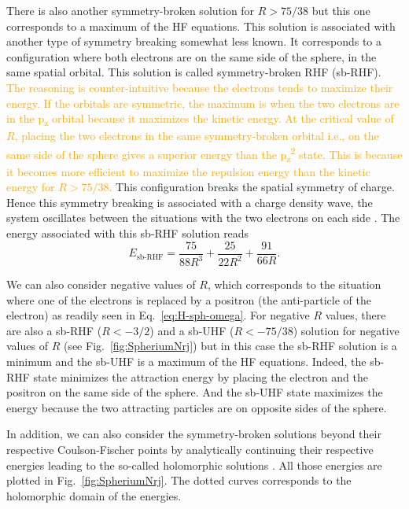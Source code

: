 \documentclass[11pt,a4paper]{article}
\newcommand{\antoine}[1]{\textcolor{orange}{#1}}
\begin{document}
There is also another symmetry-broken solution for $R>75/38$ but this one corresponds to a maximum of the HF equations. This solution is associated with another type of symmetry breaking somewhat less known. It corresponds to a configuration where both electrons are on the same side of the sphere, in the same spatial orbital. This solution is called symmetry-broken RHF (sb-RHF). \antoine{The reasoning is counter-intuitive because the electrons tends to maximize their energy. If the orbitals are symmetric, the maximum is when the two electrons are in the p\textsubscript{z} orbital because it maximizes the kinetic energy. At the critical value of $R$, placing the two electrons in the same symmetry-broken orbital i.e., on the same side of the sphere gives a superior energy than the p\textsubscript{z}\textsuperscript{2} state. This is because it becomes more efficient to maximize the repulsion energy than the kinetic energy for $R>75/38$.}
This configuration breaks the spatial symmetry of charge. Hence this symmetry breaking is associated with a charge density wave, the system oscillates between the situations with the two electrons on each side \cite{GiulianiBook}.
The energy associated with this sb-RHF solution reads
\begin{equation}
E_{\text{sb-RHF}}=\frac{75}{88R^3}+\frac{25}{22R^2}+\frac{91}{66R}.
\end{equation}

We can also consider negative values of $R$, which corresponds to the situation where one of the electrons is replaced by a positron (the anti-particle of the electron) as readily seen in Eq.~\eqref{eq:H-sph-omega}. For negative $R$ values, there are also a sb-RHF ($R<-3/2$) and a sb-UHF ($R<-75/38$) solution for negative values of $R$ (see Fig.~\ref{fig:SpheriumNrj}) but in this case the sb-RHF solution is a minimum and the sb-UHF is a maximum of the HF equations. Indeed, the sb-RHF state minimizes the attraction energy by placing the electron and the positron on the same side of the sphere. And the sb-UHF state maximizes the energy because the two attracting particles are on opposite sides of the sphere.

In addition, we can also consider the symmetry-broken solutions beyond their respective Coulson-Fischer points by analytically continuing their respective energies leading to the so-called holomorphic solutions \cite{Hiscock_2014, Burton_2019, Burton_2019a}. All those energies are plotted in Fig.~\ref{fig:SpheriumNrj}. The dotted curves corresponds to the holomorphic domain of the energies.
\end{document}
